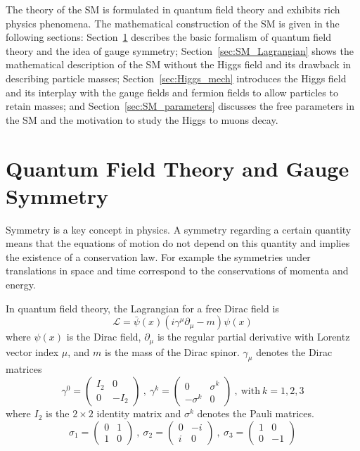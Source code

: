 The theory of the SM is formulated in quantum field theory and exhibits rich physics phenomena.
The mathematical construction of the SM is given in the following sections:
Section~\ref{sec:gauge_symmetry} describes the basic formalism of quantum field theory and the idea of gauge symmetry;
Section~\ref{sec:SM_Lagrangian} shows the mathematical description of the SM without the Higgs field and its drawback in describing particle masses;
Section~\ref{sec:Higgs_mech} introduces the Higgs field and its interplay with the gauge fields and fermion fields to allow particles to retain masses;
and Section~\ref{sec:SM_parameters} discusses the free parameters in the SM and the motivation to study the Higgs to muons decay.


\section{Quantum Field Theory and Gauge Symmetry}\label{sec:gauge_symmetry}

Symmetry is a key concept in physics. 
A symmetry regarding a certain quantity means that the equations of motion do not depend on this quantity
and implies the existence of a conservation law.
For example the symmetries under translations in space and time correspond to the conservations of momenta and energy.

In quantum field theory, the Lagrangian for a free Dirac field is 
\begin{equation}\label{eq:Dirac_Lagrangian}
    \mathcal{L} = \bar{\psi}(x)(i\gamma^{\mu}\partial_{\mu}-m)\psi(x)
\end{equation}
where $\psi(x)$ is the Dirac field,
$\partial_{\mu}$ is the regular partial derivative with Lorentz vector index $\mu$,
and $m$ is the mass of the Dirac spinor.
$\gamma_{\mu}$ denotes the Dirac matrices
\begin{equation}\label{eq:dirac_matrices}
    \gamma^{0} = \begin{pmatrix}  I_{2} & 0 \\ 0 & -I_{2}    \end{pmatrix} ~,~
    \gamma^{k} = \begin{pmatrix}  0 & \sigma^{k} \\ -\sigma^{k} & 0 \end{pmatrix} ~,~
    \text{with} ~ k = 1,2,3 
\end{equation}
where $I_{2}$ is the $2 \times 2$ identity matrix and $\sigma^{k}$ denotes the Pauli matrices.
\begin{equation}\label{eq:pauli_matrices}
    \sigma_{1} = \begin{pmatrix} 0 & 1 \\ 1 & 0 \end{pmatrix} ~,~
    \sigma_{2} = \begin{pmatrix} 0 & -i \\ i & 0\end{pmatrix} ~,~
    \sigma_{3} = \begin{pmatrix} 1 & 0 \\ 0 & -1\end{pmatrix}
\end{equation}

